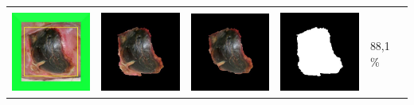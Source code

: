 \begin{table}[H]
\begin{tabular}{|m{1.1in}|m{1.1in}|m{1.1in}|m{1.1in}|m{0.7in}|}
		&  &  & \\
		\includegraphics[width=1.1in]{gambar/hasil_segmentasi/luka_hitam/image_18_rect.jpg} \fontsize{8}{12}{(50, 59, 219, 201)}&
		\includegraphics[width=1.1in]{gambar/hasil_segmentasi/luka_hitam/result_18.jpg}&
		\includegraphics[width=1.1in]{gambar/hasil_segmentasi/luka_hitam/result_18_cv.jpg}&
		\includegraphics[width=1.1in]{gambar/hasil_segmentasi/luka_hitam/mask_18.jpg}&
		88,1 \% \\
		\hline

	\end{tabular}
\end{table}


